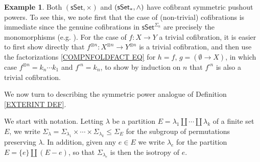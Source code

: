 \documentclass[a4paper,10pt
,draft
]{article}%
\numberwithin{equation}{section}
\numberwithin{figure}{section}
\theoremstyle{definition} %
\newtheorem{example}[equation]{Example}%
\newtheorem{remark}[equation]{Remark}%
\newcommand{\sSet}{\ensuremath{\mathsf{sSet}}}%
\newcommand{\1}{\ensuremath{\mathbbm 1}}%
\begin{document}


\begin{example}
      \label{SSET_CSPP_EX}
	Both $(\mathsf{sSet},\times)$ and 
	$(\mathsf{sSet}_{\**},\wedge)$ have cofibrant symmetric pushout powers.
        To see this, we note first that the case of (non-trivial) cofibrations is immediate since
        the genuine cofibrations in $\sSet^{\Sigma_n}$ are precisely the monomorphisms (e.g. \cite[Prop. 2.16]{Ste16}).
	For the case of $f \colon X \to Y$ a trivial cofibration, it is easier to first show directly that 
	$f^{\otimes n} \colon X^{\otimes n} \to Y^{\otimes n}$
	is a trivial cofibration, 
	and then use the factorizations
	\eqref{COMPNFOLDFACT EQ}
	for $h=f$, $g=(\emptyset \to X)$, 
	in which case $f^{\otimes n} = k_n\cdots k_1$ and 
	$f^{\square n} = k_n$,
	to show by induction on $n$ that 
	$f^{\square n}$ is also a trivial cofibration.
\end{example}


We now turn to describing the symmetric power analogue of 
Definition \ref{EXTERINT DEF}.

We start with notation. Letting 
$\lambda$ be a partition 
$E = \lambda_1 \amalg\cdots \amalg \lambda_k$
of a finite set $E$, 
we write 
 $\Sigma_{\lambda} = \Sigma_{\lambda_1} \times \cdots \times
 \Sigma_{\lambda_k} \leq \Sigma_E$ for the subgroup of permutations preserving $\lambda$. 
 In addition, given any $e \in E$ we write
$\lambda_e$ for the partition $E = \{e\} \amalg (E-e)$, so that $\Sigma_{\lambda_e}$ is then the isotropy of $e$.
\end{document}
